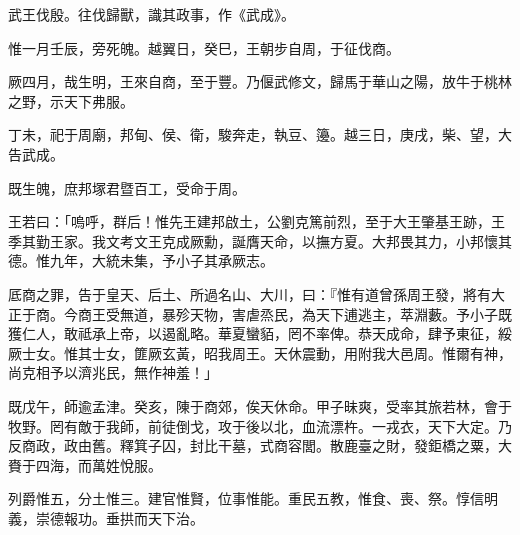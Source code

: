
\begin{pinyinscope}
武王伐殷。往伐歸獸，識其政事，作《武成》。

惟一月壬辰，旁死魄。越翼日，癸巳，王朝步自周，于征伐商。

厥四月，哉生明，王來自商，至于豐。乃偃武修文，歸馬于華山之陽，放牛于桃林之野，示天下弗服。

丁未，祀于周廟，邦甸、侯、衛，駿奔走，執豆、籩。越三日，庚戌，柴、望，大告武成。

既生魄，庶邦塚君暨百工，受命于周。

王若曰：「嗚呼，群后！惟先王建邦啟土，公劉克篤前烈，至于大王肇基王跡，王季其勤王家。我文考文王克成厥勳，誕膺天命，以撫方夏。大邦畏其力，小邦懷其德。惟九年，大統未集，予小子其承厥志。

厎商之罪，告于皇天、后土、所過名山、大川，曰：『惟有道曾孫周王發，將有大正于商。今商王受無道，暴殄天物，害虐烝民，為天下逋逃主，萃淵藪。予小子既獲仁人，敢祗承上帝，以遏亂略。華夏蠻貊，罔不率俾。恭天成命，肆予東征，綏厥士女。惟其士女，篚厥玄黃，昭我周王。天休震動，用附我大邑周。惟爾有神，尚克相予以濟兆民，無作神羞！」

既戊午，師逾孟津。癸亥，陳于商郊，俟天休命。甲子昧爽，受率其旅若林，會于牧野。罔有敵于我師，前徒倒戈，攻于後以北，血流漂杵。一戎衣，天下大定。乃反商政，政由舊。釋箕子囚，封比干墓，式商容閭。散鹿臺之財，發鉅橋之粟，大賚于四海，而萬姓悅服。

列爵惟五，分土惟三。建官惟賢，位事惟能。重民五教，惟食、喪、祭。惇信明義，崇德報功。垂拱而天下治。


\end{pinyinscope}